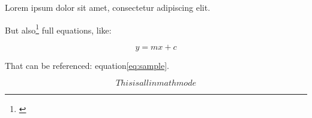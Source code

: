 Lorem ipsum dolor sit amet, consectetur adipiscing elit.

But also\footnote{\cite{minsky2017perceptrons}} full equations, like:

\begin{equation}
	\label{eq:sample}
	y = mx + c
\end{equation}

That can be referenced: equation\ref{eq:sample}.

$$This is all in math mode$$


